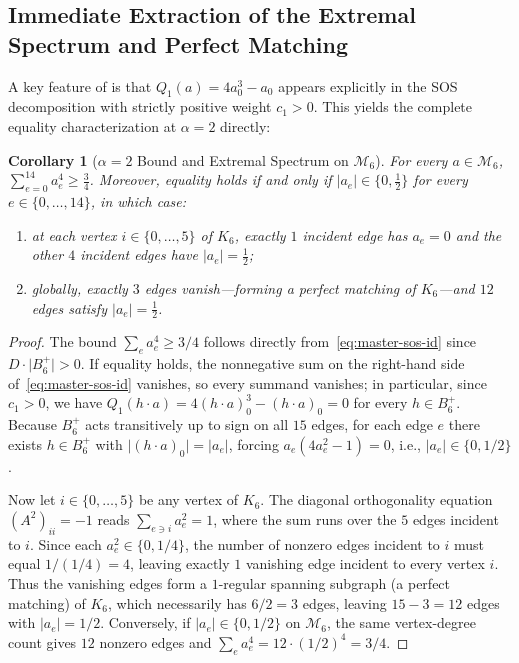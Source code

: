 \documentclass[11pt,a4paper]{article}
\theoremstyle{plain}
\newtheorem{corollary}[theorem]{Corollary}
\theoremstyle{definition}
\theoremstyle{remark}
\newcommand{\Mman}{\mathcal{M}_6}
\newcommand{\Bplus}{B_6^+}
\begin{document}
\subsection{Immediate Extraction of the Extremal Spectrum and Perfect Matching}

A key feature of  is that $Q_1(a) = 4a_0^3 - a_0$ appears explicitly in the SOS decomposition with strictly positive weight $c_1 > 0$. This yields the complete equality characterization at $\alpha = 2$ directly:

\begin{corollary}[$\alpha = 2$ Bound and Extremal Spectrum on $\Mman$]
\label{cor:so6-eq}
For every $a \in \Mman$, $\sum_{e=0}^{14} a_e^4 \ge \frac{3}{4}$. Moreover, equality holds if and only if $\lvert a_e\rvert \in \{0, \frac{1}{2}\}$ for every $e \in \{0,\dots,14\}$, in which case:
\begin{enumerate}[label=\textup{(\alph*)}, leftmargin=2em]
  \item at each vertex $i \in \{0,\dots,5\}$ of $K_6$, exactly $1$ incident edge has $a_e = 0$ and the other $4$ incident edges have $\lvert a_e\rvert = \frac{1}{2}$;
  \item globally, exactly $3$ edges vanish---forming a perfect matching of $K_6$---and $12$ edges satisfy $\lvert a_e\rvert = \frac{1}{2}$.
\end{enumerate}
\end{corollary}

\begin{proof}
The bound $\sum_e a_e^4 \ge 3/4$ follows directly from~\eqref{eq:master-sos-id} since $D \cdot \lvert\Bplus\rvert > 0$. If equality holds, the nonnegative sum on the right-hand side of~\eqref{eq:master-sos-id} vanishes, so every summand vanishes; in particular, since $c_1 > 0$, we have $Q_1(h\cdot a) = 4(h\cdot a)_0^3 - (h\cdot a)_0 = 0$ for every $h \in \Bplus$. Because $\Bplus$ acts transitively up to sign on all $15$ edges, for each edge $e$ there exists $h \in \Bplus$ with $\lvert(h\cdot a)_0\rvert = \lvert a_e\rvert$, forcing $a_e(4a_e^2 - 1) = 0$, i.e., $\lvert a_e\rvert \in \{0, 1/2\}$.

Now let $i \in \{0,\dots,5\}$ be any vertex of $K_6$. The diagonal orthogonality equation $(A^2)_{ii} = -1$ reads $\sum_{e \ni i} a_e^2 = 1$, where the sum runs over the $5$ edges incident to $i$. Since each $a_e^2 \in \{0, 1/4\}$, the number of nonzero edges incident to $i$ must equal $1/(1/4) = 4$, leaving exactly $1$ vanishing edge incident to every vertex $i$. Thus the vanishing edges form a $1$-regular spanning subgraph (a perfect matching) of $K_6$, which necessarily has $6/2 = 3$ edges, leaving $15 - 3 = 12$ edges with $\lvert a_e\rvert = 1/2$. Conversely, if $\lvert a_e\rvert \in \{0, 1/2\}$ on $\Mman$, the same vertex-degree count gives $12$ nonzero edges and $\sum_e a_e^4 = 12 \cdot (1/2)^4 = 3/4$.
\end{proof}
\end{document}
